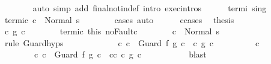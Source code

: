 \begin{isabellebody}
\ \ \ \ \ \ \isamarkupfalse%
\ {\isacharparenleft}auto\ simp\ add{\isacharcolon}\ final{\isacharunderscore}notin{\isacharunderscore}def\ intro{\isacharcolon}\ exec{\isachardot}intros{\isacharparenright}\isanewline
\ \ \ \ \isamarkupfalse%
\ termi\ s{\isacharunderscore}in{\isacharunderscore}g{\isacharprime}\ \isamarkupfalse%
\ termi{\isacharunderscore}c{\isacharprime}{\isacharcolon}\ {\isachardoublequoteopen}{\isasymGamma}{\isasymturnstile}c{\isacharprime}\ {\isasymdown}\ Normal\ s{\isachardoublequoteclose}\isanewline
\ \ \ \ \ \ \isamarkupfalse%
\ cases\ auto\isanewline
\ \ \ \ \isamarkupfalse%
\ c{\isacharunderscore}cases\ \isamarkupfalse%
\ {\isacharquery}thesis\isanewline
\ \ \ \ \isamarkupfalse%
\isanewline
\ \ \ \ \ \ \isamarkupfalse%
\ {\isachardoublequoteopen}c\ {\isasymsubseteq}\isactrlsub g\ c{\isacharprime}{\isachardoublequoteclose}\isanewline
\ \ \ \ \ \ \isamarkupfalse%
\ termi{\isacharunderscore}c{\isacharprime}\ this\ noFault{\isacharunderscore}c{\isacharprime}\isanewline
\ \ \ \ \ \ \isamarkupfalse%
\ {\isachardoublequoteopen}{\isasymGamma}{\isasymturnstile}c\ {\isasymdown}\ Normal\ s{\isachardoublequoteclose}\ \isanewline
\ \ \ \ \ \ \ \ \isamarkupfalse%
\ {\isacharparenleft}rule\ Guard{\isachardot}hyps{\isacharparenright}\isanewline
\ \ \ \ \isamarkupfalse%
\isanewline
\ \ \ \ \ \ \isamarkupfalse%
\ {\isachardoublequoteopen}{\isasymexists}c{\isacharprime}{\isacharprime}{\isachardot}\ c\ {\isacharequal}\ Guard\ f{\isacharprime}\ g{\isacharprime}\ c{\isacharprime}{\isacharprime}\ {\isasymand}\ {\isacharparenleft}c{\isacharprime}{\isacharprime}\ {\isasymsubseteq}\isactrlsub g\ c{\isacharprime}{\isacharparenright}{\isachardoublequoteclose}\isanewline
\ \ \ \ \ \ \isamarkupfalse%
\ \isamarkupfalse%
\ c{\isacharprime}{\isacharprime}\ \isanewline
\ \ \ \ \ \ \ \ c{\isacharcolon}\ {\isachardoublequoteopen}c\ {\isacharequal}\ Guard\ f{\isacharprime}\ g{\isacharprime}\ c{\isacharprime}{\isacharprime}{\isachardoublequoteclose}\ \ c{\isacharprime}{\isacharprime}{\isacharunderscore}c{\isacharprime}{\isacharcolon}\ {\isachardoublequoteopen}c{\isacharprime}{\isacharprime}\ {\isasymsubseteq}\isactrlsub g\ c{\isacharprime}{\isachardoublequoteclose}\ \isanewline
\ \ \ \ \ \ \ \ \isamarkupfalse%
\ blast\isanewline
\ \ \ \ \ \ \isamarkupfalse%

\end{isabellebody}
